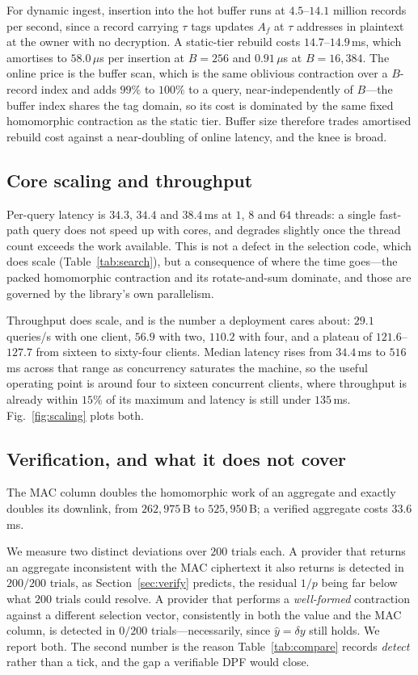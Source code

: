 \documentclass[journal]{IEEEtran}
\begin{document}
For dynamic ingest, insertion into the hot buffer runs at $4.5$--$14.1$ million
records per second, since a record carrying $\tau$ tags updates $A_f$ at $\tau$
addresses in plaintext at the owner with no decryption. A static-tier rebuild
costs $14.7$--$14.9$\,ms, which amortises to $58.0\,\mu$s per insertion at
$B=256$ and $0.91\,\mu$s at $B=16{,}384$. The online price is the buffer scan,
which is the same oblivious contraction over a $B$-record index and adds $99\%$
to $100\%$ to a query, near-independently of $B$---the buffer index shares the
tag domain, so its cost is dominated by the same fixed homomorphic contraction
as the static tier. Buffer size therefore trades amortised rebuild cost against
a near-doubling of online latency, and the knee is broad.

\subsection{Core scaling and throughput}
Per-query latency is $34.3$, $34.4$ and $38.4$\,ms at $1$, $8$ and $64$ threads:
a single fast-path query does not speed up with cores, and degrades slightly
once the thread count exceeds the work available. This is not a defect in the
selection code, which does scale (Table~\ref{tab:search}), but a consequence of
where the time goes---the packed homomorphic contraction and its rotate-and-sum
dominate, and those are governed by the library's own parallelism.

Throughput does scale, and is the number a deployment cares about: $29.1$
queries/s with one client, $56.9$ with two, $110.2$ with four, and a plateau of
$121.6$--$127.7$ from sixteen to sixty-four clients. Median latency rises from
$34.4$\,ms to $516$\,ms across that range as concurrency saturates the machine,
so the useful operating point is around four to sixteen concurrent clients,
where throughput is already within $15\%$ of its maximum and latency is still
under $135$\,ms. Fig.~\ref{fig:scaling} plots both.

\subsection{Verification, and what it does not cover}
The MAC column doubles the homomorphic work of an aggregate and exactly doubles
its downlink, from $262{,}975$\,B to $525{,}950$\,B; a verified aggregate costs
$33.6$\,ms.

We measure two distinct deviations over $200$ trials each. A provider that
returns an aggregate inconsistent with the MAC ciphertext it also returns is
detected in $200/200$ trials, as Section~\ref{sec:verify} predicts, the residual
$1/p$ being far below what $200$ trials could resolve. A provider that performs
a \emph{well-formed} contraction against a different selection vector,
consistently in both the value and the MAC column, is detected in $0/200$
trials---necessarily, since $\hat{y}=\delta y$ still holds. We report both. The
second number is the reason Table~\ref{tab:compare} records \emph{detect} rather
than a tick, and the gap a verifiable DPF would close.
\end{document}
